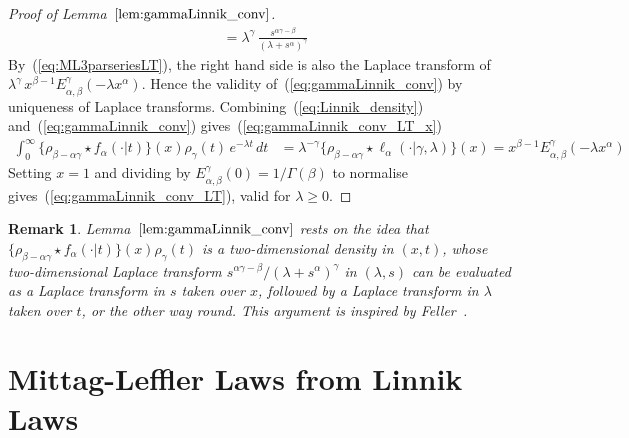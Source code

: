 \documentclass[a4paper,12pt]{article}
\newtheorem{remark}{Remark}
\begin{document}
{{\begin{proof} [Proof of Lemma~$\ref{lem:gammaLinnik_conv}$]
\begin{align*}
&=  \lambda^{\gamma} \, \frac{s^{\alpha\gamma-\beta}}{(\lambda+ s^\alpha)^{\gamma}} 
\end{align*}
By~(\ref{eq:ML3parseriesLT}), the right hand side is also the Laplace transform of 
$\lambda^{\gamma} \, x^{\beta-1}E^\gamma_{\alpha,\beta}(-\lambda x^\alpha)$.
Hence the validity of~(\ref{eq:gammaLinnik_conv})  by uniqueness of Laplace transforms.
Combining~(\ref{eq:Linnik_density}) and~(\ref{eq:gammaLinnik_conv}) gives~(\ref{eq:gammaLinnik_conv_LT_x})
 \begin{align*}
\int_0^\infty \{\rho_{\beta-\alpha\gamma} \star f_\alpha(\cdot\vert  t)\}(x)\rho_\gamma(t) \,  e^{-\lambda t} \, dt
&= \lambda^{-\gamma} \{\rho_{\beta-\alpha\gamma}\star \ell_\alpha(\cdot \vert \gamma, \lambda)\}(x)
=  x^{\beta-1}E^\gamma_{\alpha,\beta}(-\lambda x^\alpha)
\end{align*}
Setting $x=1$  and  dividing by $E^\gamma_{\alpha,\beta}(0)=1/\Gamma(\beta)$ to normalise
gives~(\ref{eq:gammaLinnik_conv_LT}), valid for $\lambda\ge0$.
\end{proof} 
\begin{remark}
\label{rem:gammaLinnik_conv}
Lemma~$\ref{lem:gammaLinnik_conv}$ rests on the idea  that 
$\{\rho_{\beta-\alpha\gamma} \star f_\alpha(\cdot\vert  t)\}(x)\rho_\gamma(t)$ is a  two-dimensional density in $(x,t)$, %
whose two-dimensional  Laplace transform $s^{\alpha\gamma-\beta}/(\lambda+ s^\alpha)^{\gamma}$  in $(\lambda,s)$ can be 
evaluated  as a Laplace transform in $s$ taken over  $x$, followed by a Laplace transform in $\lambda$ taken over $t$, or the other way round.
This argument  is inspired by Feller~{\rm \cite[XIII.8(b)]{Feller2}}.
\end{remark}


\section{Mittag-Leffler Laws from Linnik Laws}
\label{sec:ML_laws}

}}
\end{document}

